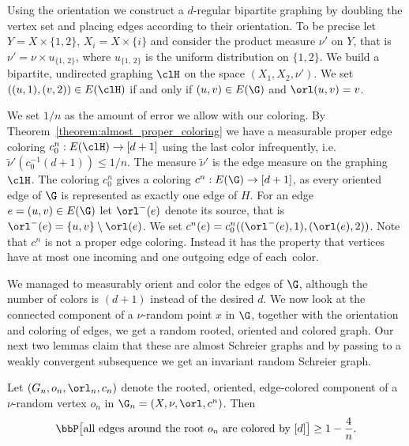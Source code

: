 Using the orientation we construct a $d$-regular bipartite graphing by doubling the vertex set and placing edges according to their orientation. To be precise let $Y=X \times \{1,2\}$, $X_i= X \times \{i\}$ and consider the product measure $\nu'$ on $Y$, that is $\nu' = \nu \times u_{\{1,\,2\}}$, where $u_{\{1,\,2\}}$ is the uniform distribution on $\{1,2\}$. We build a bipartite, undirected graphing $\clH$ on the space $(X_1, X_2, \nu')$. We set $((u,1),(v,2)) \in E(\clH)$ if and only if $(u,v) \in E(\G)$ and $\orl(u,v) = v$.

We set $1/n$ as the amount of error we allow with our coloring. By Theorem~\ref{theorem:almost_proper_coloring} we have a measurable proper edge coloring $c^{n}_0:E(\clH) \to [d+1]$ using the last color infrequently, i.e.\ $\widetilde{\nu}'(c_0^{-1}(d+1))\leq 1/n$. The measure $\widetilde{\nu}'$ is the edge measure on the graphing $\clH$. The coloring $c^n_0$ gives a coloring $c^n: E(\G) \to [d+1]$, as every oriented edge of $\G$ is represented as exactly one edge of $H$. For an edge $e=(u,v) \in E(\G)$ let $\orl^{-}(e)$ denote its source, that is $\orl^{-}(e)=\{u,v\} \setminus \orl(e)$. We set $c^n(e) = c^n_0 ((\orl^{-}(e),1),(\orl(e),2))$. Note that $c^n$ is not a proper edge coloring. Instead it has the property that vertices have at most one incoming and one outgoing edge of each~color.

We managed to measurably orient and color the edges of $\G$, although the number of colors is $(d+1)$ instead of the desired $d$. We now look at the connected component of a $\nu$-random point $x$ in $\G$, together with the orientation and coloring of edges, we get a random rooted, oriented and colored graph. Our next two lemmas claim that these are almost Schreier graphs and by passing to a weakly convergent subsequence we get an invariant random Schreier graph.

\begin{lemm}\label{lemma:almost_schreier}
Let $(G_n,o_n,\orl_n, c_n)$ denote the rooted, oriented, edge-colored component of a $\nu$-random vertex $o_n$ in $\G_n=(X, \nu, \orl, c^n)$. Then
\[
\bbP \big[\text{all edges around the root } o_n \text{ are colored by } [d]\big] \geq 1 - \frac{4}{n}.
\]
\end{lemm}

